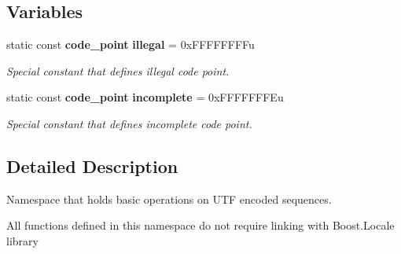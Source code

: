 \subsection*{Variables}
\begin{DoxyCompactItemize}
\item 
static const {\bf code\+\_\+point} {\bf illegal} = 0x\+F\+F\+F\+F\+F\+F\+F\+Fu\label{namespacebooster_1_1locale_1_1utf_ab35dbcade4df8d0f26cc47ab9b72bb61}

\begin{DoxyCompactList}\small\item\em Special constant that defines illegal code point. \end{DoxyCompactList}\item 
static const {\bf code\+\_\+point} {\bf incomplete} = 0x\+F\+F\+F\+F\+F\+F\+F\+Eu\label{namespacebooster_1_1locale_1_1utf_acdeb3c57cea57cdfa1d9af057253621a}

\begin{DoxyCompactList}\small\item\em Special constant that defines incomplete code point. \end{DoxyCompactList}\end{DoxyCompactItemize}


\subsection{Detailed Description}
Namespace that holds basic operations on U\+TF encoded sequences. 

All functions defined in this namespace do not require linking with Boost.\+Locale library 